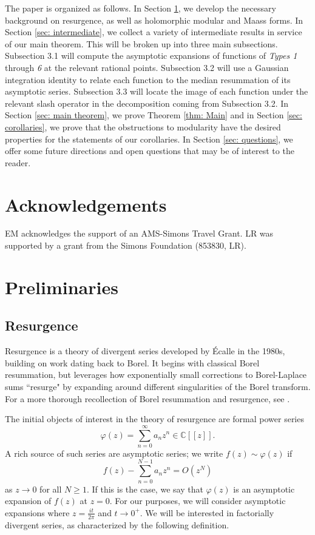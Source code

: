 \documentclass[12pt]{amsart}
\theoremstyle{definition}
\theoremstyle{plain}
\numberwithin{equation}{section}
\begin{document}
The paper is organized as follows. In Section \ref{sec: prelims}, we develop the necessary background on resurgence, as well as holomorphic modular and Maass forms. In Section \ref{sec: intermediate}, we collect a variety of intermediate results in service of our main theorem. 
This will be broken up into three main subsections. 
Subsection 3.1 will compute the asymptotic expansions of functions of \emph{Types 1} through \emph{6} at the relevant rational points. Subsection 3.2 will use a Gaussian integration identity to relate each function to the median resummation of its asymptotic series. Subsection 3.3 will locate the image of each function under the relevant slash operator in the decomposition coming from Subsection 3.2.
In Section \ref{sec: main theorem}, we prove Theorem \ref{thm: Main} and in Section \ref{sec: corollaries}, we prove that the obstructions to modularity have the desired properties for the statements of our corollaries. In Section \ref{sec: questions}, we offer some future directions and open questions that may be of interest to the reader. 

\section*{Acknowledgements}
EM acknowledges the support of an AMS-Simons Travel Grant.  LR was supported by a grant from the Simons Foundation (853830, LR).

\section{Preliminaries}\label{sec: prelims}

\subsection{Resurgence} \label{subsec: resurgence}

Resurgence is a theory of divergent series developed by \'Ecalle in the 1980s, building on work dating back to Borel. It begins with classical Borel resummation, but leverages how exponentially small corrections to Borel-Laplace sums ``resurge" by expanding around different singularities of the Borel transform. For a more thorough recollection of Borel resummation and resurgence, see \cite{Balser, Costin, Sauzin}.

The initial objects of interest in the theory of resurgence are formal power series
\[
\varphi(z) = \sum_{n =0}^\infty a_n z^{n} \in \mathbb{C}[[z]].
\]
A rich source of such series are asymptotic series; 
we write
$\displaystyle{f(z) \sim \varphi(z)}$
if 
\[
f(z) - \sum_{n=0}^{N-1}a_nz^n = O(z^N)
\]
as $z \to 0$ for all $N \geq 1$. If this is the case, we say that $\varphi(z)$ is an asymptotic expansion of $f(z)$ at $z=0$. For our purposes, we will consider asymptotic expansions where $z = \frac{it}{2\pi}$ and $t \to 0^+$. 
We will be interested in factorially divergent series, as characterized by the following definition.
\end{document}
